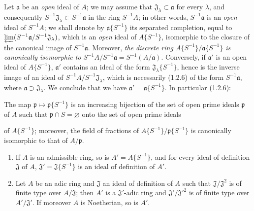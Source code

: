 \begin{env}[7.6.9]
\label{0.7.6.9}
Let $\mathfrak a$ be an \emph{open} ideal of $A$; we may assume that
$\mathfrak J_\lambda\subset\mathfrak a$ for every $\lambda$, and consequently
$S^{-1}\mathfrak J_\lambda\subset S^{-1}\mathfrak a$ in the ring
$S^{-1}A$; in other words, $S^{-1}\mathfrak a$ is an \emph{open} ideal of
$S^{-1}A$; we shall denote by $\mathfrak a\{S^{-1}\}$ its separated completion,
equal to $\varprojlim(S^{-1}\mathfrak a/S^{-1}\mathfrak J_\lambda)$, which is an
\emph{open} ideal of $A\{S^{-1}\}$, isomorphic to the closure of the canonical
image of $S^{-1}\mathfrak a$. Moreover, \emph{the discrete ring
$A\{S^{-1}\}/\mathfrak a\{S^{-1}\}$ is canonically isomorphic to
$S^{-1}A/S^{-1}\mathfrak a=S^{-1}(A/\mathfrak a)$}. Conversely, if
$\mathfrak a'$ is an open ideal of $A\{S^{-1}\}$, $\mathfrak a'$ contains
an ideal of the form $\mathfrak J_\lambda\{S^{-1}\}$, hence is the inverse
image of an ideal of $S^{-1}A/S^{-1}\mathfrak J_\lambda$, which is
necessarily (1.2.6) of the form $S^{-1}\mathfrak a$, where
$\mathfrak a\supset\mathfrak J_\lambda$. We conclude that we have
$\mathfrak a'=\mathfrak a\{S^{-1}\}$. In particular (1.2.6):
\end{env}

\begin{proposition}[7.6.10]
\label{0.7.6.10}
The map $\mathfrak p\mapsto\mathfrak p\{S^{-1}\}$ is an increasing
bijection of the set of open prime ideals $\mathfrak p$ of $A$ such
that $\mathfrak p\cap S=\varnothing$ onto the set of open prime ideals


of $A\{S^{-1}\}$; moreover, the field of fractions of
$A\{S^{-1}\}/\mathfrak p\{S^{-1}\}$ is canonically isomorphic to that of
$A/\mathfrak p$.
\end{proposition}

\begin{proposition}[7.6.11]
\label{0.7.6.11}
\begin{enumerate}
  \item[\rm(i)] If $A$ is an admissible ring, so is
    $A'=A\{S^{-1}\}$, and for every ideal of definition $\mathfrak J$ of $A$,
    $\mathfrak J'=\mathfrak J\{S^{-1}\}$ is an ideal of definition of $A'$.
  \item[\rm(ii)] Let $A$ be an adic ring and $\mathfrak J$ an ideal of
    definition of $A$ such that $\mathfrak J/\mathfrak J^2$ is of finite type
    over $A/\mathfrak J$; then $A'$ is a $\mathfrak J'$-adic ring and
    $\mathfrak J'/\mathfrak J'^2$ is of finite type over
    $A'/\mathfrak J'$. If moreover $A$ is Noetherian, so is
    $A'$.
\end{enumerate}
\end{proposition}

